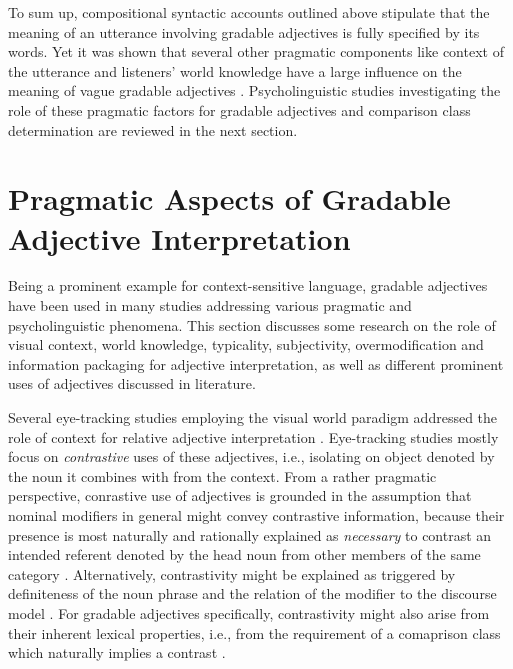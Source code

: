 To sum up, compositional syntactic accounts outlined above stipulate that the meaning of an utterance involving gradable adjectives is fully specified by its words. Yet it was shown that several other pragmatic components like context of the utterance and listeners’ world knowledge have a large influence on the meaning of vague gradable adjectives \parencite[e.g.,][]{tessler2017warm, Kennedy2007}. Psycholinguistic studies investigating the role of these pragmatic factors for gradable adjectives and comparison class determination are reviewed in the next section. 

\section{Pragmatic Aspects of Gradable Adjective Interpretation}
\label{2.4.}
Being a prominent example for context-sensitive language, gradable adjectives have been used in many studies addressing various pragmatic and psycholinguistic phenomena. This section discusses some research on the role of visual context, world knowledge, typicality, subjectivity, overmodification and information packaging for adjective interpretation, as well as different prominent uses of adjectives discussed in literature. %

Several eye-tracking studies employing the  visual world paradigm addressed the role of context for relative adjective interpretation \parencite[e.g.,][]{sedivy1999, Aparicio2016}.
Eye-tracking studies mostly focus on \textit{contrastive} uses of these adjectives, i.e., isolating on object denoted by the noun it combines with from the context. From a rather pragmatic perspective, conrastive use of adjectives is grounded in the assumption that nominal modifiers in general might convey contrastive information, because their presence is most naturally and rationally explained as \emph{necessary} to contrast an intended referent denoted by the head noun from other members of the same category \parencite{sedivy1999, clifton1989ambiguity}. Alternatively, contrastivity might be explained as triggered by definiteness of the noun phrase and the relation of the modifier to the discourse model \parencite{sedivy1999, steedman1989ambiguity}. For gradable adjectives specifically, contrastivity might also arise from their inherent lexical properties, i.e., from the requirement of a comaprison class which naturally implies a contrast \parencite{Bierwisch1989, sedivy1999}. 

